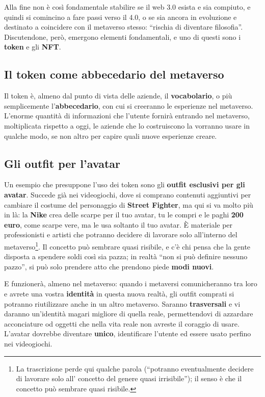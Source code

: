 Alla fine non è così fondamentale stabilire se il web 3.0 esista e sia compiuto,
e quindi si comincino a fare passi verso il 4.0, o se sia ancora in evoluzione e
destinato a coincidere con il metaverso stesso: ``rischia di diventare
filosofia''. Discutendone, però, emergono elementi fondamentali, e uno di
questi sono i \textbf{token} e gli \textbf{NFT}.

\subsection{Il token come abbecedario del metaverso}

Il token è, almeno dal punto di vista delle aziende, il \textbf{vocabolario}, o
più semplicemente l'\textbf{abbecedario}, con cui si creeranno le esperienze nel
metaverso. L'enorme quantità di informazioni che l'utente fornirà entrando nel
metaverso, moltiplicata rispetto a oggi, le aziende che lo costruiscono la
vorranno usare in qualche modo, se non altro per capire quali nuove esperienze
creare.

\subsection{Gli outfit per l'avatar}

Un esempio che presuppone l'uso dei token sono gli \textbf{outfit esclusivi per
gli avatar}. Succede già nei videogiochi, dove si comprano contenuti aggiuntivi
per cambiare il costume del personaggio di \textbf{Street Fighter}, ma qui si va
molto più in là: la \textbf{Nike} crea delle scarpe per il tuo avatar, tu le
compri e le paghi \textbf{200 euro}, come scarpe vere, ma le usa soltanto il tuo
avatar. È materiale per professionisti e artisti che potranno decidere di
lavorare solo all'interno del metaverso\footnote{La trascrizione perde qui
qualche parola (``potranno eventualmente decidere di lavorare solo all' concetto
del genere quasi irrisibile''); il senso è che il concetto può sembrare quasi
risibile.}. Il concetto può sembrare quasi risibile, e c'è chi pensa che la gente
disposta a spendere soldi così sia pazza; in realtà ``non si può definire
nessuno pazzo'', si può solo prendere atto che prendono piede \textbf{modi
nuovi}.

E funzionerà, almeno nel metaverso: quando i metaversi comunicheranno tra loro e
avrete una vostra \textbf{identità} in questa nuova realtà, gli outfit comprati
si potranno riutilizzare anche in un altro metaverso. Saranno
\textbf{trasversali} e vi daranno un'identità magari migliore di quella reale,
permettendovi di azzardare acconciature od oggetti che nella vita reale non
avreste il coraggio di usare. L'avatar dovrebbe diventare \textbf{unico},
identificare l'utente ed essere usato perfino nei videogiochi.

